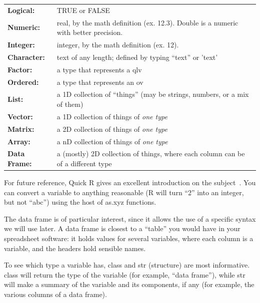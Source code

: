 \documentclass{report}
\newcommand{\code}[1]{\textsf{\ttfamily #1}}
\begin{document}
	\begin{tabularx}{\textwidth}{>{\bfseries}l X}
		Logical: & TRUE or FALSE\\[0.2cm]
		Numeric: & real, by the math definition (ex. 12.3). Double is a numeric with better precision.\\[0.2cm]
		Integer: & integer, by the math definition (ex. 12).\\[0.2cm]
		Character: & text of any length; defined by typing ``text'' or 'text'\\[0.2cm]
		Factor: & a type that represents a \gls{qlv}\\[0.2cm]
		Ordered: & a type that represents an \gls{ov}\\[0.2cm]
		List: & a 1D collection of ``things'' (may be strings, numbers, or a mix of them)\\[0.2cm]
		Vector: & a 1D collection of things of \emph{one type}\\[0.2cm]
		Matrix: & a 2D collection of things of \emph{one type}\\[0.2cm]
		Array: & a nD collection of things of \emph{one type}\\[0.2cm]
		Data Frame: & a (mostly) 2D collection of things, where each column can be of a different type
	\end{tabularx}

	For future reference, Quick R gives an excellent introduction on the subject~\cite{quickr}. You can convert a variable to anything reasonable (R will turn ``2'' into an integer, but not ``abc'') using the host of \code{as.xyz} functions.

	The data frame is of particular interest, since it allows the use of a specific syntax we will use later. A data frame is closest to a ``table'' you would have in your spreadsheet software: it holds values for several variables, where each column is a variable, and the headers hold sensible names.

	To see which type a variable has, \code{class} and \code{str} (structure) are most informative. \code{class} will return the type of the variable (for example, ``data frame''), while \code{str} will make a summary of the variable and its components, if any (for example, the various columns of a data frame).
\end{document}
